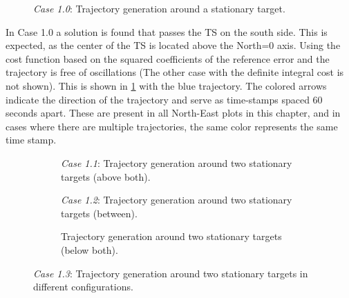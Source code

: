 \begin{figure}
    \centering
    
    \caption{\emph{Case 1.0}: Trajectory generation around a stationary target. }
    \label{fig:stationary-target}
\end{figure}

In Case 1.0 a solution is found that passes the TS on the south side. This is expected, as the center of the TS is located above the North=0 axis. Using the cost function based on the squared coefficients of the reference error and the trajectory is free of oscillations (The other case with the definite integral cost is not shown). This is shown in \cref{fig:stationary-target} with the blue trajectory. The colored arrows indicate the direction of the trajectory and serve as time-stamps  spaced 60 seconds apart. These are present in all North-East plots in this chapter, and in cases where there are multiple trajectories, the same color represents the same time stamp. 


\begin{figure}[hbtp]
    \centering
    \begin{subfigure}[b]{\textwidth}
        \centering
        
        \caption{\emph{Case 1.1}: Trajectory generation around two stationary targets (above both).}
        \label{fig:stationary-target-2}
    \end{subfigure}
    \hfill
    \begin{subfigure}[b]{\textwidth}
        \centering
        
        \caption{\emph{Case 1.2}: Trajectory generation around two stationary targets (between).}
        \label{fig:stationary-target-3}
    \end{subfigure}
    \hfill
    \begin{subfigure}[b]{\textwidth}
        \centering
        
        \caption{Trajectory generation around two stationary targets (below both).}
        \label{fig:stationary-target-4}
    \end{subfigure}
    \caption{\emph{Case 1.3}: Trajectory generation around two stationary targets in different configurations.}
    \label{fig:stationary-targets-subfigures}
\end{figure}


